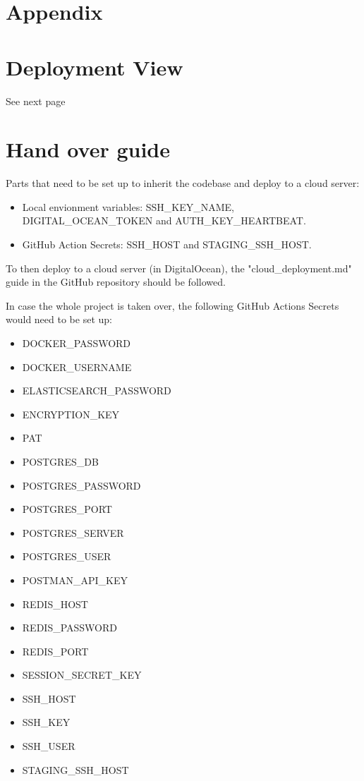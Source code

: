 \pagebreak
\printbibliography


\pagebreak
\section{Appendix}
\appendix


\section{Deployment View}
See next page
\label{appendix:DeploymentView}

\section{Hand over guide}
\label{appendix:handOverGuide}
Parts that need to be set up to inherit the codebase and deploy to a cloud server:
\begin{itemize}
    \item Local envionment variables: SSH\_KEY\_NAME, DIGITAL\_OCEAN\_TOKEN and AUTH\_KEY\_HEARTBEAT.
    \item GitHub Action Secrets: SSH\_HOST and STAGING\_SSH\_HOST.
\end{itemize}
To then deploy to a cloud server (in DigitalOcean), the "cloud\_deployment.md" guide in the GitHub repository should be followed.

In case the whole project is taken over, the following GitHub Actions Secrets would need to be set up:
\begin{itemize}
    \item DOCKER\_PASSWORD
    \item DOCKER\_USERNAME
    \item ELASTICSEARCH\_PASSWORD
    \item ENCRYPTION\_KEY
    \item PAT
    \item POSTGRES\_DB
    \item POSTGRES\_PASSWORD
    \item POSTGRES\_PORT
    \item POSTGRES\_SERVER
    \item POSTGRES\_USER
    \item POSTMAN\_API\_KEY
    \item REDIS\_HOST
    \item REDIS\_PASSWORD
    \item REDIS\_PORT
    \item SESSION\_SECRET\_KEY
    \item SSH\_HOST
    \item SSH\_KEY
    \item SSH\_USER
    \item STAGING\_SSH\_HOST
\end{itemize}

